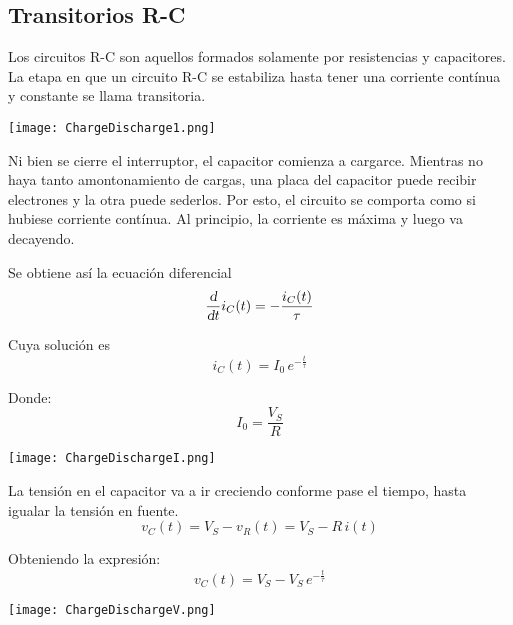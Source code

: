 \documentclass[a5paper,12pt,twoside]{book}
\begin{document}
\subsection*{Transitorios R-C}

Los circuitos R-C son aquellos formados solamente por resistencias y capacitores. La etapa en que un circuito R-C se estabiliza hasta tener una corriente contínua y constante se llama transitoria.

\begin{center}
    \texttt{[image: ChargeDischarge1.png]}
\end{center}

Ni bien se cierre el interruptor, el capacitor comienza a cargarce. Mientras no haya tanto amontonamiento de cargas, una placa del capacitor puede recibir electrones y la otra puede sederlos. Por esto, el circuito se comporta como si hubiese corriente contínua. Al principio, la corriente es máxima y luego va decayendo.

Se obtiene así la ecuación diferencial
\begin{equation*}
    \frac{\textsl{d}}{\textsl{d} t} i_C(t) = - \frac{i_C(t)}{\tau}
\end{equation*}

Cuya solución es
\begin{equation*}
    i_C(t) = I_0 \, e^{-\tfrac{t}{\tau}}
\end{equation*}

Donde:
\begin{equation*}
    I_0 = \frac{V_S}{R}
\end{equation*}

\begin{center}
    \texttt{[image: ChargeDischargeI.png]}
\end{center}

La tensión en el capacitor va a ir creciendo conforme pase el tiempo, hasta igualar la tensión en fuente.
\begin{equation*}
    v_C(t) = V_S - v_R(t) = V_S - R \, i(t)
\end{equation*}

Obteniendo la expresión:
\begin{equation*}
v_C(t) = V_S - V_S \, e^{-\tfrac{t}{\tau}}
\end{equation*}

\begin{center}
    \texttt{[image: ChargeDischargeV.png]}
\end{center}
\end{document}
